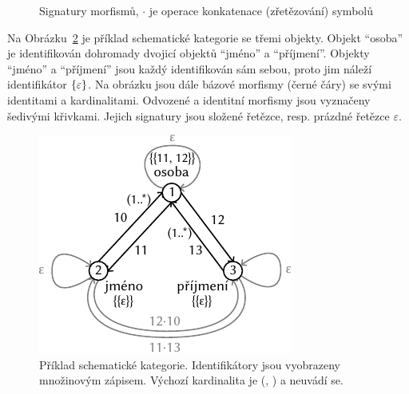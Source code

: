\begin{figure}[!htb]
  \centering
  \caption{Signatury morfismů, $\cdot$ je operace konkatenace (zřetězování) symbolů}
  \label{fig:morphism-signatures}
\end{figure}

Na Obrázku~\ref{fig:raw-schemcat} je příklad schematické kategorie se třemi objekty.
Objekt \enquote{osoba} je identifikován dohromady dvojicí objektů \enquote{jméno} a \enquote{příjmení}.
Objekty \enquote{jméno} a \enquote{příjmení} jsou každý identifikován sám sebou, proto jim náleží identifikátor $\left\{\varepsilon\right\}$.
Na obrázku jsou dále bázové morfismy (černé čáry) se svými identitami a kardinalitami.
Odvozené a identitní morfismy jsou vyznačeny šedivými křivkami.
Jejich signatury jsou složené řetězce, resp. prázdné řetězce $\varepsilon$.

\begin{figure}[!htb]
  \centering
  \includegraphics[width=\maxwidth{\textwidth}]{../img/schemcat-diagrams/raw-schemcat-example.pdf}
  \caption[Příklad schematické kategorie]{Příklad schematické kategorie. Identifikátory jsou vyobrazeny množinovým zápisem. Výchozí kardinalita je (\one, \one) a neuvádí se.}
  \label{fig:raw-schemcat}
\end{figure}

